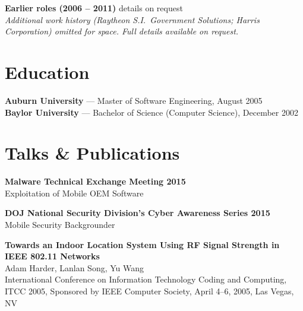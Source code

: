 \documentclass[11pt,letterpaper]{article}
\begin{document}
\noindent\textbf{\color{accent}Earlier roles (2006 -- 2011)} \hfill {\small\color{accentlight}details on request}\\
{\small\itshape Additional work history (Raytheon S.I.\ Government Solutions; Harris Corporation) omitted for space. Full details available on request.}

\section*{Education}
\textbf{Auburn University} --- Master of Software Engineering, August 2005\\[2pt]
\textbf{Baylor University} --- Bachelor of Science (Computer Science),
December 2002

\section*{Talks \& Publications}

\textbf{Malware Technical Exchange Meeting 2015}\\
Exploitation of Mobile OEM Software

\bigskip
\textbf{DOJ National Security Division's Cyber Awareness Series 2015}\\
Mobile Security Backgrounder

\bigskip
\textbf{Towards an Indoor Location System Using RF Signal Strength in
IEEE 802.11 Networks}\\
Adam Harder, Lanlan Song, Yu Wang\\
International Conference on Information Technology Coding and Computing,
ITCC 2005, Sponsored by IEEE Computer Society, April 4--6, 2005,
Las Vegas, NV
\end{document}
